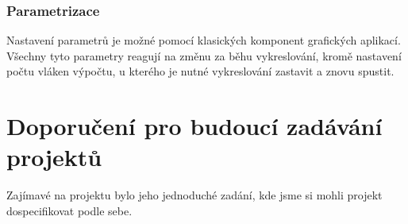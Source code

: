 \documentclass[12pt,a4paper,titlepage,final]{report}
\begin{document}
\subsection{Parametrizace}
Nastavení parametrů je možné pomocí klasických komponent grafických aplikací. Všechny tyto parametry reagují na změnu za běhu vykreslování, kromě nastavení počtu vláken výpočtu, u kterého je nutné vykreslování zastavit a znovu spustit.

\chapter{Doporučení pro budoucí zadávání projektů}

Zajímavé na projektu bylo jeho jednoduché zadání, kde jsme si mohli projekt dospecifikovat podle sebe. 





\end{document}
